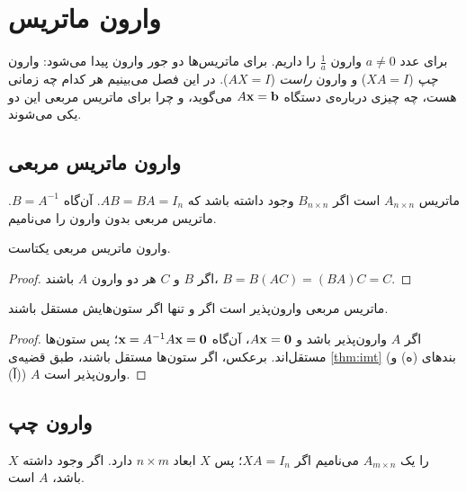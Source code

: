 \chapter{وارون ماتریس}
\label{ch:inverse}

برای عدد $a\neq0$ وارون  $\frac1a$ را داریم. برای ماتریس‌ها دو جور وارون پیدا می‌شود: وارون \emph{چپ} ($XA=I$) و وارون \emph{راست} ($AX=I$). در این فصل می‌بینیم هر کدام چه زمانی هست، چه چیزی درباره‌ی دستگاه $A\mathbf{x}=\mathbf{b}$ می‌گوید، و چرا برای ماتریس مربعی این دو یکی می‌شوند.

\section{وارون ماتریس مربعی}

\begin{definition}
ماتریس $A_{n\times n}$  است اگر $B_{n\times n}$ وجود داشته باشد که $AB=BA=I_n$. آن‌گاه $B=A^{-1}$. ماتریس مربعی بدون وارون را  می‌نامیم.
\end{definition}

\begin{theorem}\label{thm:inv-unique}
وارون ماتریس مربعی یکتاست.
\end{theorem}
\begin{proof}
اگر $B$ و $C$ هر دو وارون $A$ باشند، $B=B(AC)=(BA)C=C$.
\end{proof}

\begin{theorem}\label{thm:square-inv-indep}
ماتریس مربعی وارون‌پذیر است اگر و تنها اگر ستون‌هایش مستقل باشند.
\end{theorem}
\begin{proof}
اگر $A$ وارون‌پذیر باشد و $A\mathbf{x}=\mathbf{0}$، آن‌گاه $\mathbf{x}=A^{-1}A\mathbf{x}=\mathbf{0}$؛ پس ستون‌ها مستقل‌اند. برعکس، اگر ستون‌ها مستقل باشند، طبق قضیه‌ی \ref{thm:imt} (بندهای (ه) و (آ)) $A$ وارون‌پذیر است.
\end{proof}

\section{وارون چپ}

\begin{definition}[وارون چپ]
$X$ را یک  $A_{m\times n}$ می‌نامیم اگر $XA=I_n$؛ پس $X$ ابعاد $n\times m$ دارد. اگر وجود داشته باشد، $A$  است.
\end{definition}

